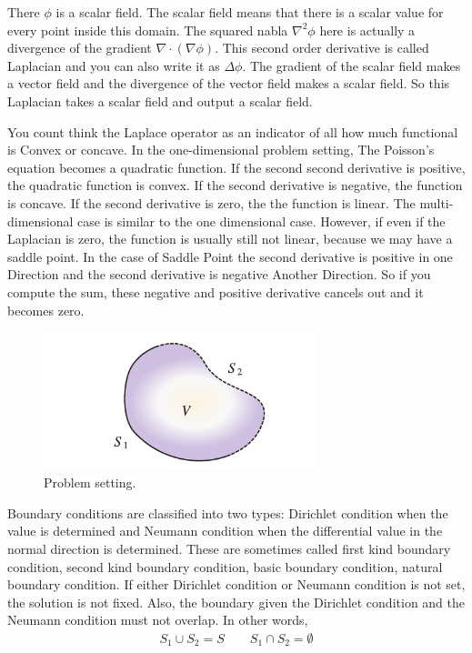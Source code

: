 %
There $\phi$ is a scalar field.
%
The scalar field means that there is a scalar value for every point inside this domain.
%
The squared nabla $\nabla^2\phi$ here is actually a divergence of the gradient $\nabla\cdot (\nabla \phi)$.
%
This second order derivative is called Laplacian and you can also write it as $\Delta \phi$. 
%
The gradient of the scalar field makes a vector field and the divergence of the vector field makes a scalar field. 
%
So this Laplacian takes a scalar field and output a scalar field.



You count think the Laplace operator as an indicator of all how much functional is Convex or concave. 
%
In the one-dimensional problem setting, The Poisson's equation becomes a quadratic function. 
%
If the second second derivative is positive, the quadratic function is convex. 
%
If the second derivative is negative, the function is concave.
%
If the second derivative is zero, the the function is linear.
%
The multi-dimensional case is similar to the one dimensional case. 
%
However, if even if the Laplacian is zero, the function is usually still not linear, because we may have a saddle point. 
%
In the case of Saddle Point the second derivative is positive in one Direction and the second derivative is negative Another Direction.
%
So if you compute the sum, these negative and positive derivative cancels out and it becomes zero.




\begin{figure}[htbp!]
	\center
    \includegraphics[width=80mm]{images/lap_domain}
    \caption{Problem setting.}
    \label{fig:lap_domain}
\end{figure}

Boundary conditions are classified into two types: Dirichlet condition when the value is determined and Neumann condition when the differential value in the normal direction is determined.
%
These are sometimes called first kind boundary condition, second kind boundary condition, basic boundary condition, natural boundary condition.
If either Dirichlet condition or Neumann condition is not set, the solution is not fixed.
%
Also, the boundary given the Dirichlet condition and the Neumann condition must not overlap.
%
In other words,
%
\begin{eqnarray}
S_1 \cup S_2 = S \qquad S_1 \cap S_2 = \emptyset
\end{eqnarray}




